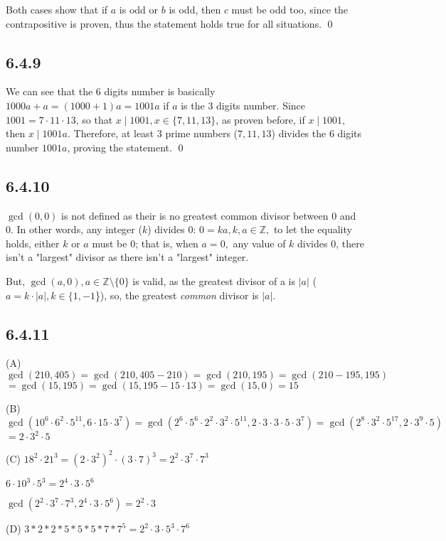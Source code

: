 \documentclass{article}
\begin{document}
Both cases show that if $a$ is odd or $b$ is odd, then $c$ must be odd too, since the contrapositive is proven, thus the statement holds true for all situations. \qed

\subsection*{6.4.9}

We can see that the 6 digits number is basically $1000a+a=(1000+1)a=1001a$ if $a$ is the 3 digits number. Since $1001=7\cdot11\cdot13$,  so that $x \mid 1001, x\in\{7,11,13\}$, as proven before, if $x\mid 1001,$ then $x\mid 1001a.$ Therefore, at least 3 prime numbers ($7,11,13$) divides the 6 digits number $1001a$, proving the statement. \qed

\subsection*{6.4.10}

$\gcd(0,0)$ is not defined as their is no greatest common divisor between 0 and 0. In other words, any integer ($k$) divides 0: $0=ka,k,a\in\mathbb{Z},$ to let the equality holds, either $k$ or $a$ must be 0; that is, when $a=0,$ any value of $k$ divides 0, there isn't a "largest" divisor as there isn't a "largest" integer. 

But, $\gcd(a,0),a\in\mathbb{Z}\setminus\{0\}$ is valid, as the greatest divisor of a is $|a|$ ($a= k\cdot |a|, k\in\{1,-1$\}), so, the greatest \textit{common} divisor is $|a|.$  

\subsection*{6.4.11}

(A) $\gcd(210,405)=\gcd(210,405-210)=\gcd(210,195)=\gcd(210-195,195)$$=\gcd(15,195)=\gcd(15,195-15\cdot13)=\gcd(15,0)=15$ 

(B) $\gcd(10^6\cdot6^2\cdot5^{11},6\cdot15\cdot3^7)=\gcd(2^6\cdot5^6\cdot2^2\cdot3^2\cdot5^{11},2\cdot3\cdot3\cdot5\cdot3^7)=\gcd(2^8\cdot3^2\cdot5^{17},2\cdot3^9\cdot5)$ 
$=2\cdot3^2\cdot5$ 

(C) $18^2\cdot21^3=(2\cdot3^2)^2\cdot(3\cdot7)^3=2^2\cdot3^7\cdot7^3$

$6\cdot10^3\cdot5^3=2^4\cdot3\cdot5^6$

$\gcd(2^2\cdot3^7\cdot7^3,2^4\cdot3\cdot5^6)=2^2\cdot3$

(D) $3*2*2*5*5*5*7*7^5=2^2\cdot3\cdot5^3\cdot7^6$
\end{document}
